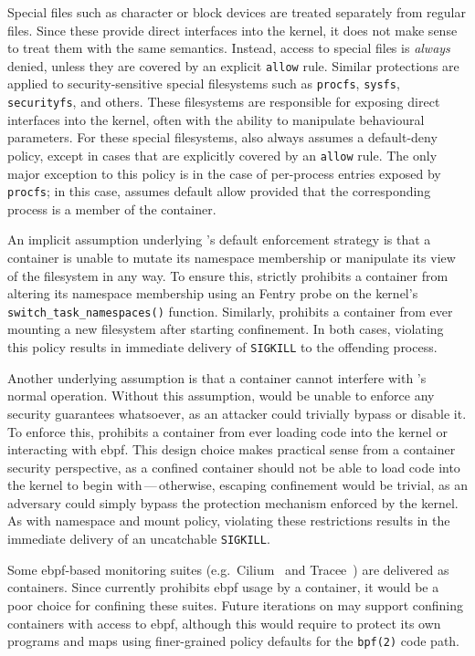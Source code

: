 Special files such as character or block devices are treated separately from regular
files. Since these provide direct interfaces into the kernel, it does not make sense to
treat them with the same semantics. Instead, access to special files is \textit{always}
denied, unless they are covered by an explicit \texttt{allow} rule. Similar protections
are applied to security-sensitive special filesystems such as \texttt{procfs},
\texttt{sysfs}, \texttt{securityfs}, and others. These filesystems are responsible for
exposing direct interfaces into the kernel, often with the ability to manipulate
behavioural parameters. For these special filesystems, \bpfcontain{} also always assumes
a default-deny policy, except in cases that are explicitly covered by an \texttt{allow}
rule. The only major exception to this policy is in the case of per-process entries
exposed by \texttt{procfs}; in this case, \bpfcontain{} assumes default allow provided
that the corresponding process is a member of the container.

An implicit assumption underlying \bpfcontain{}'s default enforcement strategy is that
a container is unable to mutate its namespace membership or manipulate its view of the
filesystem in any way. To ensure this, \bpfcontain{} strictly prohibits a container from
altering its namespace membership using an Fentry probe on the kernel's
\texttt{switch\_task\_namespaces()} function. Similarly, \bpfcontain{} prohibits
a container from ever mounting a new filesystem after starting confinement. In both cases,
violating this policy results in immediate delivery of \texttt{SIGKILL} to the offending
process.

Another underlying assumption is that a container cannot interfere with \bpfcontain{}'s
normal operation. Without this assumption, \bpfcontain{} would be unable to enforce any
security guarantees whatsoever, as an attacker could trivially bypass or disable it. To
enforce this, \bpfcontain{} prohibits a container from ever loading code into the kernel
or interacting with \gls{ebpf}. This design choice makes practical sense from a container
security perspective, as a confined container should not be able to load code into the
kernel to begin with\,---\,otherwise, escaping confinement would be trivial, as an
adversary could simply bypass the protection mechanism enforced by the kernel. As with
namespace and mount policy, violating these restrictions results in the immediate delivery
of an uncatchable \texttt{SIGKILL}.

Some \gls{ebpf}-based monitoring suites (e.g.~Cilium~\cite{cilium} and
Tracee~\cite{tracee}) are delivered as containers. Since \bpfcontain{} currently prohibits
\gls{ebpf} usage by a container, it would be a poor choice for confining these suites.
Future iterations on \bpfcontain{} may support confining containers with access to
\gls{ebpf}, although this would require \bpfcontain{} to protect its own programs and maps
using finer-grained policy defaults for the \texttt{bpf(2)} code path.

